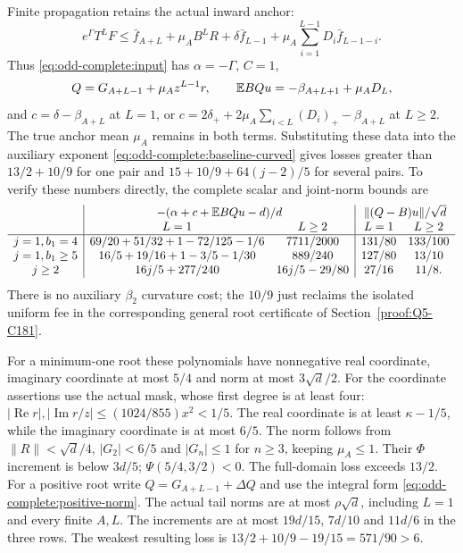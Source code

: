 Finite propagation retains the actual inward anchor:
\begin{equation}\label{eq:odd-anchor:general-finite}
 e^\Gamma T^LF\le\bar f_{A+L}+\mu_AB^LR
       +\delta\bar f_{L-1}
       +\mu_A\sum_{i=1}^{L-1}D_i\bar f_{L-1-i}.
\end{equation}
Thus \eqref{eq:odd-complete:input} has $\alpha=-\Gamma$,
$C=1$,
\[
 Q=G_{A+L-1}+\mu_A z^{L-1}r,\qquad
 \mathbb E BQu=-\beta_{A+L+1}+\mu_A D_L,
\]
and $c=\delta-\beta_{A+L}$ at $L=1$, or
$c=2\delta_++2\mu_A\sum_{i<L}(D_i)_+-\beta_{A+L}$ at
$L\ge2$. The true anchor mean $\mu_A$ remains in both terms.
Substituting these data into the auxiliary exponent
\eqref{eq:odd-complete:baseline-curved} gives losses greater
than $13/2+10/9$ for one pair and
$15+10/9+64(j-2)/5$ for several pairs. To verify these numbers
directly, the complete scalar and joint-norm bounds are
\[
\begin{array}{c|cc|cc}
 &\multicolumn{2}{c|}{-(\alpha+c+\E BQu-d)/d}
 &\multicolumn{2}{c}{\|(Q-B)u\|/\sqrt d}\\
 &L=1&L\ge2&L=1&L\ge2\\\hline
 j=1,b_1=4&69/20+51/32+1-72/125-1/6&7711/2000&131/80&133/100\\
 j=1,b_1\ge5&16/5+19/16+1-3/5-1/30&889/240&127/80&13/10\\
 j\ge2&16j/5+277/240&16j/5-29/80&27/16&11/8.
\end{array}
\]
There is no auxiliary $\beta_2$ curvature cost; the $10/9$ just
reclaims the isolated uniform fee in the corresponding general
root certificate of Section~\ref{proof:Q5-C181}.

For a minimum-one root these polynomials have nonnegative real
coordinate, imaginary coordinate at most $5/4$ and norm at most
$3\sqrt d/2$. For the coordinate assertions use the actual mask,
whose first degree is at least four:
$|\operatorname{Re}r|,|\operatorname{Im}r/z|
 \le(1024/855)x^2<1/5$.
The real coordinate is at least $\kappa-1/5$, while the
imaginary coordinate is at most $6/5$. The norm follows from
$\|R\|<\sqrt d/4$, $|G_2|<6/5$ and $|G_n|\le1$ for
$n\ge3$, keeping $\mu_A\le1$.
Their $\Phi$ increment is below $3d/5$;
$\Psi(5/4,3/2)<0$. The full-domain loss exceeds $13/2$.
For a positive root write $Q=G_{A+L-1}+\Delta Q$ and use
the integral form \eqref{eq:odd-complete:positive-norm}.
The actual tail norms are at most $\rho\sqrt d$, including
$L=1$ and every finite $A,L$. The increments are at most
$19d/15$, $7d/10$ and $11d/6$ in the three rows.
The weakest resulting loss is
$13/2+10/9-19/15=571/90>6$.


